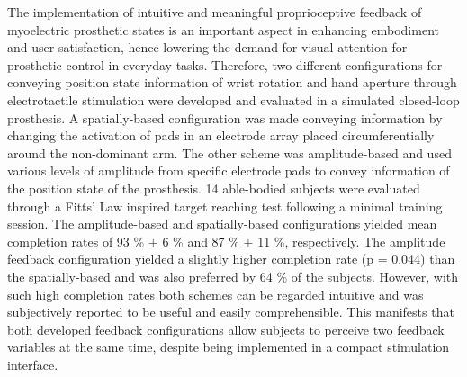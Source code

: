 The implementation of intuitive and meaningful proprioceptive feedback of myoelectric prosthetic states is an important aspect in enhancing embodiment and user satisfaction, hence lowering the demand for visual attention for prosthetic control in everyday tasks. Therefore, two different configurations for conveying position state information of wrist rotation and hand aperture through electrotactile stimulation were developed and evaluated in a simulated closed-loop prosthesis. A spatially-based configuration was made conveying information by changing the activation of pads in an electrode array placed circumferentially around the non-dominant arm. The other scheme was amplitude-based and used various levels of amplitude from specific electrode pads to convey information of the position state of the prosthesis. 14 able-bodied subjects were evaluated through a Fitts' Law inspired target reaching test following a minimal training session.
The amplitude-based and spatially-based configurations yielded mean completion rates of 93 \% $\boldsymbol{\pm}$ 6 \% and 87 \% $\boldsymbol{\pm}$ 11 \%, respectively. The amplitude feedback configuration yielded a slightly higher completion rate (p = 0.044) than the spatially-based and was also preferred by 64 \% of the subjects. However, with such high completion rates both schemes can be regarded intuitive and was subjectively reported to be useful and easily comprehensible. This manifests that both developed feedback configurations allow subjects to perceive two feedback variables at the same time, despite being implemented in a compact stimulation interface. 
 
 
 
